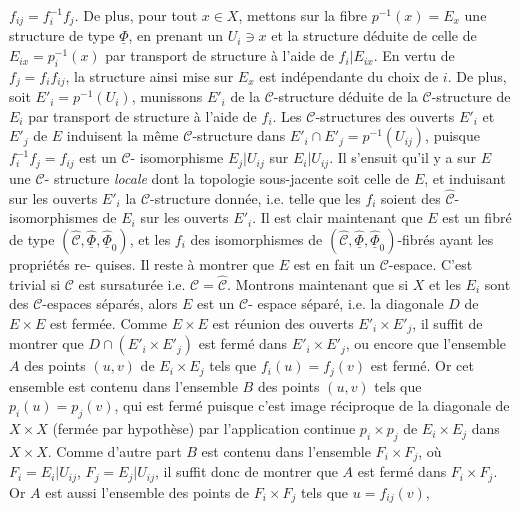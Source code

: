 

$f_{ij} = f_i^{-1} f_j$. De plus, pour tout $x \in X$, mettons sur la fibre $p^{-1}(x) = E_x$
une structure de type $\underline{\Phi}$, en prenant un $U_i \ni x$ et la structure déduite
de celle de $E_{ix} = p_i^{-1}(x)$ par transport de structure à l'aide de $f_i \vert E_{ix}$.
En vertu de $f_j = f_i f_{ij}$, la structure ainsi mise sur $E_x$ est indépendante
du choix de $i$. De plus, soit $E'_i = p^{-1}(U_i)$, munissons $E'_i$ de la $\mathcal{C}$-structure
déduite de la $\mathcal{C}$-structure de $E_i$ par transport de structure à l'aide
de $f_i$. Les $\mathcal{C}$-structures des ouverts $E'_i$ et $E'_j$ de $E$ induisent la même
$\mathcal{C}$-structure dans $E'_i \cap E'_j = p^{-1}(U_{ij})$, puisque $f_i^{-1} f_j = f_{ij}$ est un $\mathcal{C}$-
isomorphisme $E_j \vert U_{ij}$ sur $E_i \vert U_{ij}$. Il s'ensuit qu'il y a sur $E$ une $\mathcal{C}$-
structure \emph{locale} dont la topologie sous-jacente soit celle de $E$,
et induisant sur les ouverts $E'_i$ la $\mathcal{C}$-structure donnée, i.e. telle
que les $f_i$ soient des $\hat{\mathcal{C}}$-isomorphismes de $E_i$ sur les ouverts $E'_i$. Il
est clair maintenant que $E$ est un fibré de type $(\hat{\mathcal{C}}, \hat{\underline{\Phi}}, \hat{\underline{\Phi}}_0)$, et les
$f_i$ des isomorphismes de $(\hat{\mathcal{C}}, \hat{\underline{\Phi}}, \hat{\underline{\Phi}}_0)$-fibrés ayant les propriétés re-
quises. Il reste à montrer que $E$ est en fait un $\mathcal{C}$-espace. C'est
trivial si $\mathcal{C}$ est sursaturée i.e. $\mathcal{C} = \hat{\mathcal{C}}$. Montrons maintenant
que si $X$ et les $E_i$ sont des $\mathcal{C}$-espaces séparés, alors $E$ est un $\mathcal{C}$-
espace séparé, i.e. la diagonale $D$ de $E \times E$ est fermée. Comme $E \times E$ est
réunion des ouverts $E'_i \times E'_j$, il suffit de montrer que $D \cap (E'_i \times E'_j)$ est
fermé dans $E'_i \times E'_j$, ou encore que l'ensemble $A$ des points $(u,v)$ de
$E_i \times E_j$ tels que $f_i(u) = f_j(v)$ est fermé. Or cet ensemble est contenu
dans l'ensemble $B$ des points $(u,v)$ tels que $p_i(u) = p_j(v)$, qui est
fermé puisque c'est image réciproque de la diagonale de $X \times X$ (fermée
par hypothèse) par l'application continue $p_i \times p_j$ de $E_i \times E_j$ dans $X \times X$.
Comme d'autre part $B$ est contenu dans l'ensemble $F_i \times F_j$, où $F_i = E_i \vert U_{ij}$,
$F_j = E_j \vert U_{ij}$, il suffit donc de montrer que $A$ est fermé dans $F_i \times F_j$.
Or $A$ est aussi l'ensemble des points de $F_i \times F_j$ tels que $u = f_{ij}(v)$,

